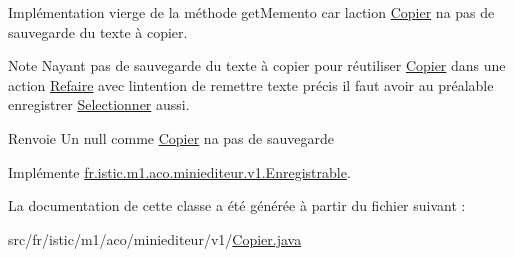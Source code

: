 Implémentation vierge de la méthode get\+Memento car l\textquotesingle{}action \hyperlink{classfr_1_1istic_1_1m1_1_1aco_1_1miniediteur_1_1v1_1_1Copier}{Copier} n\textquotesingle{}a pas de sauvegarde du texte à copier. 

\begin{DoxyNote}{Note}
N\textquotesingle{}ayant pas de sauvegarde du texte à copier pour réutiliser \hyperlink{classfr_1_1istic_1_1m1_1_1aco_1_1miniediteur_1_1v1_1_1Copier}{Copier} dans une action \hyperlink{classfr_1_1istic_1_1m1_1_1aco_1_1miniediteur_1_1v1_1_1Refaire}{Refaire} avec l\textquotesingle{}intention de remettre texte précis il faut avoir au préalable enregistrer \hyperlink{classfr_1_1istic_1_1m1_1_1aco_1_1miniediteur_1_1v1_1_1Selectionner}{Selectionner} aussi. 
\end{DoxyNote}
\begin{DoxyReturn}{Renvoie}
Un null comme \hyperlink{classfr_1_1istic_1_1m1_1_1aco_1_1miniediteur_1_1v1_1_1Copier}{Copier} n\textquotesingle{}a pas de sauvegarde 
\end{DoxyReturn}


Implémente \hyperlink{interfacefr_1_1istic_1_1m1_1_1aco_1_1miniediteur_1_1v1_1_1Enregistrable_aadf173c765d103d3924bbb688c45abb6}{fr.\+istic.\+m1.\+aco.\+miniediteur.\+v1.\+Enregistrable}.



La documentation de cette classe a été générée à partir du fichier suivant \+:\begin{DoxyCompactItemize}
\item 
src/fr/istic/m1/aco/miniediteur/v1/\hyperlink{Copier_8java}{Copier.\+java}\end{DoxyCompactItemize}
